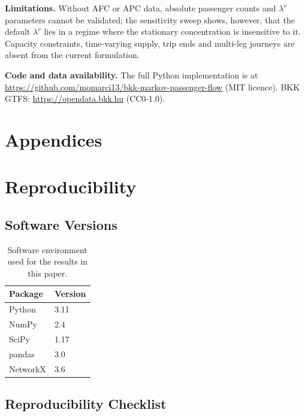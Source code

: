 \documentclass[12pt,a4paper]{article}
\theoremstyle{plain}
\theoremstyle{definition}
\theoremstyle{remark}
\begin{document}
\textbf{Limitations.}  Without AFC or APC data, absolute passenger counts and
$\lambda^v$ parameters cannot be validated; the sensitivity sweep shows,
however, that the default $\lambda^v$ lies in a regime where the stationary
concentration is insensitive to it.  Capacity constraints, time-varying supply,
trip ends and multi-leg journeys are absent from the current formulation.

\textbf{Code and data availability.}  The full Python implementation is at
\url{https://github.com/momarci13/bkk-markov-passenger-flow} (MIT licence).  BKK GTFS:
\url{https://opendata.bkk.hu} (CC0-1.0).


\clearpage



\appendix
\renewcommand{\thesection}{\Alph{section}}
\renewcommand{\thesubsection}{\thesection.\arabic{subsection}}
\section*{Appendices}
\setcounter{section}{0}
\section{Reproducibility}
\label{app:repro}

\subsection{Software Versions}

\begin{table}[htbp]
\centering
\small
\begin{tabular}{ll}
\toprule
Package & Version \\
\midrule
Python    & 3.11 \\
NumPy     & 2.4 \\
SciPy     & 1.17 \\
pandas    & 3.0 \\
NetworkX  & 3.6 \\
\bottomrule
\end{tabular}
\caption{Software environment used for the results in this paper.}
\end{table}

\subsection{Reproducibility Checklist}
\end{document}
